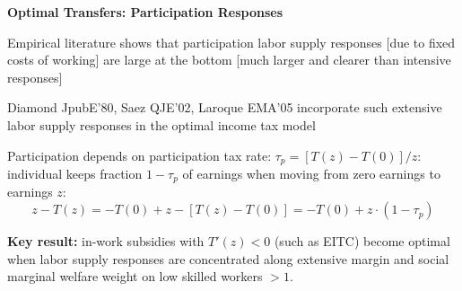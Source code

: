 \documentclass[landscape]{slides}
\begin{document}
\begin{slide}
\begin{center}
{\bf Optimal Transfers: Participation Responses}
\end{center}
Empirical literature shows that participation labor supply
responses [due to fixed costs of working] are large at the bottom
[much larger and clearer than intensive responses]

Diamond JpubE'80, Saez QJE'02, Laroque EMA'05 incorporate such
extensive labor supply responses in the optimal income tax model

Participation depends on participation tax rate:
$\tau_p=[T(z)-T(0)]/z$: individual keeps fraction $1-\tau_p$ of
earnings when moving from zero earnings to earnings $z$:
\[z-T(z)=-T(0)+z - [T(z)-T(0)] = -T(0) + z \cdot (1-\tau_p) \]

{\bf Key result:} in-work subsidies with $T'(z)<0$ (such as EITC)
become optimal when labor supply responses are concentrated along
extensive margin and social marginal welfare weight on low skilled
workers $>1$.

\end{slide}



%
%
%
%
%
%
%

\begin{slide}

\end{slide}
\end{document}
